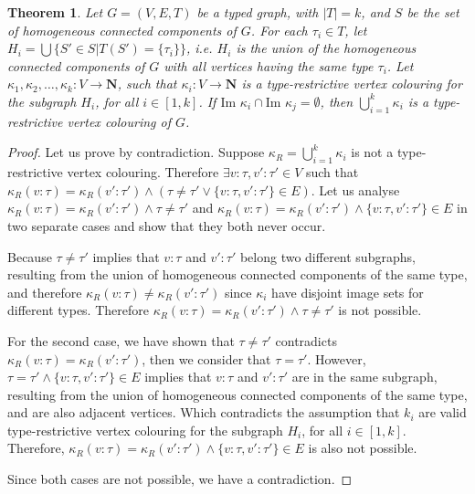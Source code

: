 \documentclass[preprint,12pt]{elsarticle}
\theoremstyle{plain}
\newtheorem{theorem}{Theorem}[section]
\newcommand\tyv[2]{#1\!\!:\!\!#2}
\newcommand{\Image}{\mathrm{Im}}
\begin{document}
\begin{theorem}
Let $G = (V,E,T)$ be a typed graph, with $|T| = k$,
and $S$ be the set of homogeneous connected components of $G$.
For each $\tau_i \in T$, let $H_i = \bigcup \{S'\in S| T(S') = \{\tau_i\}\}$,
i.e. $H_i$ is the union of the homogeneous connected components of $G$
with all vertices having the same type $\tau_i$.
Let $\kappa_1,\kappa_2,\ldots,\kappa_k:V\rightarrow\mathbf{N}$,
such that $\kappa_i:V\rightarrow\mathbf{N}$ is a
type-restrictive vertex colouring for the subgraph $H_i$, for all $i\in[1,k]$.
If $\Image\,\,\kappa_i \cap \Image\,\,\kappa_j = \emptyset$,
then $\bigcup_{i=1}^k \kappa_i$ is a
type-restrictive vertex colouring of $G$.
\end{theorem}
\begin{proof}
Let us prove by contradiction.
Suppose $\kappa_R = \bigcup_{i=1}^k\kappa_i$ is not a
type-restrictive vertex colouring.
Therefore
$\exists \tyv{v}{\tau},\tyv{v'}{\tau'}\in V$
such that
$\kappa_R(\tyv{v}{\tau})=\kappa_R(\tyv{v'}{\tau'}) \wedge (\tau\neq\tau' \vee \{\tyv{v}{\tau},\tyv{v'}{\tau'}\}\in E)$.
Let us analyse
$\kappa_R(\tyv{v}{\tau})=\kappa_R(\tyv{v'}{\tau'}) \wedge \tau\neq\tau'$
and
$\kappa_R(\tyv{v}{\tau})=\kappa_R(\tyv{v'}{\tau'}) \wedge \{\tyv{v}{\tau},\tyv{v'}{\tau'}\}\in E$
in two separate cases and show that they both never occur.

Because $\tau\neq\tau'$ implies that 
$\tyv{v}{\tau}$ and $\tyv{v'}{\tau'}$ belong two different subgraphs,
resulting from the union of homogeneous connected components of the same type,
and therefore 
$\kappa_R(\tyv{v}{\tau}) \neq \kappa_R(\tyv{v'}{\tau'})$
since $\kappa_i$ have disjoint image sets for different types.
Therefore 
$\kappa_R(\tyv{v}{\tau})=\kappa_R(\tyv{v'}{\tau'}) \wedge \tau\neq\tau'$
is not possible.

For the second case, we have shown that $\tau\neq\tau'$ contradicts 
$\kappa_R(\tyv{v}{\tau})=\kappa_R(\tyv{v'}{\tau'})$, then we consider that
$\tau=\tau'$.
However, $\tau=\tau'\wedge \{\tyv{v}{\tau},\tyv{v'}{\tau'}\}\in E$
implies that 
$\tyv{v}{\tau}$ and $\tyv{v'}{\tau'}$ are in the same
subgraph, resulting from the union of homogeneous connected components of the same type,
and are also adjacent vertices.
Which contradicts the assumption that $k_i$ are valid 
type-restrictive vertex colouring for the subgraph $H_i$, for all $i\in[1,k]$.
Therefore,
$\kappa_R(\tyv{v}{\tau})=\kappa_R(\tyv{v'}{\tau'}) \wedge \{\tyv{v}{\tau},\tyv{v'}{\tau'}\}\in E$
is also not possible.

Since both cases are not possible,
we have a contradiction.
\end{proof}
\end{document}
